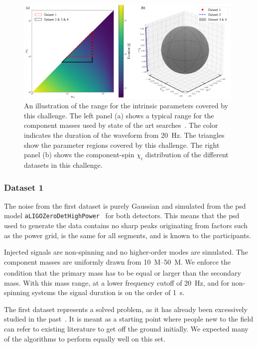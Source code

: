 \begin{figure}
    \centering
    \includegraphics[width=0.98\textwidth]{chapters/mdc/images/combined.pdf}
    \caption[Parameter space]{An illustration of the range for the intrinsic parameters covered by this challenge. The left panel (a) shows a typical range for the component masses used by state of the art searches~\cite{Nitz:2021zwj}. The color indicates the duration of the waveform from \SI{20}{\hertz}. The triangles show the parameter regions covered by this challenge. The right panel (b) shows the component-spin $\chi_i$ distribution of the different datasets in this challenge.}
    \label{fig:parameters}
\end{figure}

\subsubsection{Dataset 1}
The noise from the first dataset is purely Gaussian and simulated from the \acrshort{psd} model \verb|aLIGOZeroDetHighPower|~\cite{lalsuite} for both detectors. This means that the \acrshort{psd} used to generate the data contains no sharp peaks originating from factors such as the power grid, is the same for all segments, and is known to the participants.

Injected signals are non-spinning and no higher-order modes are simulated. The component masses are uniformly drawn from \SIrange{10}{50}{M_\odot}. We enforce the condition that the primary mass has to be equal or larger than the secondary mass. With this mass range, at a lower frequency cutoff of \SI{20}{\hertz}, and for non-spinning systems the signal duration is on the order of \SI{1}{\second}.

The first dataset represents a solved problem, as it has already been excessively studied in the past~\cite{George:2016hay, Gabbard:2017lja, Schafer:2021cml}. It is meant as a starting point where people new to the field can refer to existing literature to get off the ground initially. We expected many of the algorithms to perform equally well on this set.

